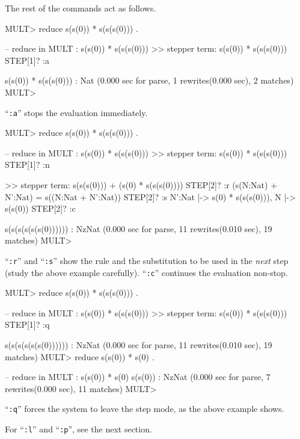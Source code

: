 \documentclass[a4paper]{memoir}
\begin{document}
The rest of the commands act as follows.
\begin{vvtm}
\begin{ccode}
  MULT> reduce s(s(0)) * s(s(s(0))) .

  -- reduce in MULT : s(s(0)) * s(s(s(0)))
  >> stepper term: s(s(0)) * s(s(s(0)))
  STEP[1]? :a     

  s(s(0)) * s(s(s(0))) : Nat
  (0.000 sec for parse, 1 rewrites(0.000 sec), 2 matches)
  MULT> 
\end{ccode}
\end{vvtm}
``\verb|:a|'' stops the evaluation immediately.
\begin{vvtm}
\begin{ccode}
  MULT> reduce s(s(0)) * s(s(s(0))) .

  -- reduce in MULT : s(s(0)) * s(s(s(0)))
  >> stepper term: s(s(0)) * s(s(s(0)))
  STEP[1]? :n

  >> stepper term: s(s(s(0))) + (s(0) * s(s(s(0))))
  STEP[2]? :r
  (s(N:Nat) + N':Nat) = s((N:Nat + N':Nat))
  STEP[2]? :s
  { N':Nat |-> s(0) * s(s(s(0))), N |-> s(s(0)) }
  STEP[2]? :c

  s(s(s(s(s(s(0)))))) : NzNat
  (0.000 sec for parse, 11 rewrites(0.010 sec), 19 matches)
  MULT> 
\end{ccode}
\end{vvtm}
``\verb|:r|'' and ``\verb|:s|'' show the
rule and the substitution to be used in
the {\em next} step (study the above example carefully). ``\verb|:c|''
continues the evaluation non-stop.

\begin{vvtm}
\begin{ccode}
  MULT> reduce s(s(0)) * s(s(s(0))) .

  -- reduce in MULT : s(s(0)) * s(s(s(0)))
  >> stepper term: s(s(0)) * s(s(s(0)))
  STEP[1]? :q

  s(s(s(s(s(s(0)))))) : NzNat
  (0.000 sec for parse, 11 rewrites(0.010 sec), 19 matches)
  MULT> reduce s(s(0)) * s(0) .

  -- reduce in MULT : s(s(0)) * s(0)
  s(s(0)) : NzNat
  (0.000 sec for parse, 7 rewrites(0.000 sec), 11 matches)
  MULT> 
\end{ccode}
\end{vvtm}
``\verb|:q|'' forces the system to leave the step mode, as the above
example shows.

For ``\verb|:l|'' and ``\verb|:p|'', see the next section.
\end{document}
